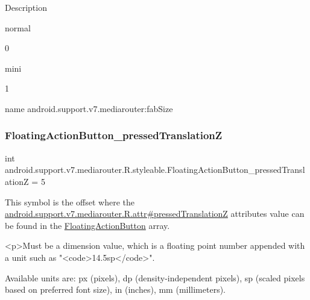 Description 

{\ttfamily normal}

0

{\ttfamily mini}

1

name android.\+support.\+v7.\+mediarouter\+:fab\+Size \mbox{\label{classandroid_1_1support_1_1v7_1_1mediarouter_1_1R_1_1styleable_aa52a7c21087dc6e360ad24e8b65e15ef}} 
\subsubsection{\texorpdfstring{Floating\+Action\+Button\+\_\+pressed\+TranslationZ}{FloatingActionButton\_pressedTranslationZ}}
{\footnotesize\ttfamily int android.\+support.\+v7.\+mediarouter.\+R.\+styleable.\+Floating\+Action\+Button\+\_\+pressed\+TranslationZ = 5\hspace{0.3cm}{\ttfamily [static]}}

This symbol is the offset where the \hyperlink{classandroid_1_1support_1_1v7_1_1mediarouter_1_1R_1_1attr_a71e55611e4cc49c76b82bdde3905b633}{android.\+support.\+v7.\+mediarouter.\+R.\+attr\#pressed\+TranslationZ} attribute\textquotesingle{}s value can be found in the \hyperlink{classandroid_1_1support_1_1v7_1_1mediarouter_1_1R_1_1styleable_ae665bad1758a0b708ec034929b76af91}{Floating\+Action\+Button} array.

\begin{DoxyVerb}      <p>Must be a dimension value, which is a floating point number appended with a unit such as "<code>14.5sp</code>".
\end{DoxyVerb}
 Available units are\+: px (pixels), dp (density-\/independent pixels), sp (scaled pixels based on preferred font size), in (inches), mm (millimeters). 

